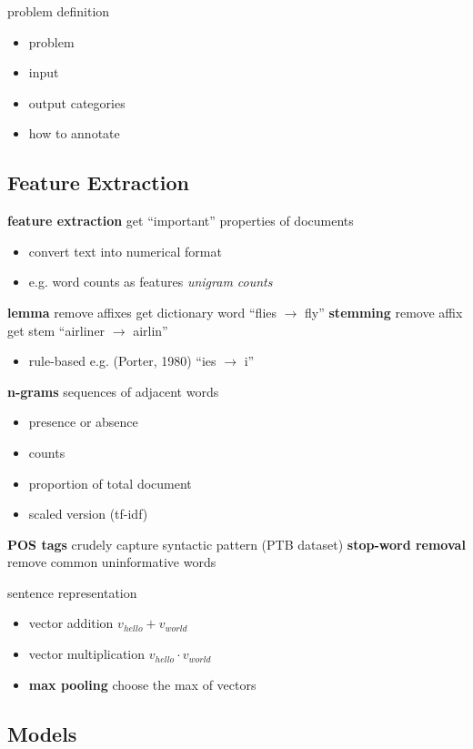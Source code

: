 \documentclass[]{article}
\theoremstyle{definition}
\begin{document}
problem definition
\begin{itemize}
    \item problem
    \item input
    \item output categories
    \item how to annotate
\end{itemize}

\subsection{Feature Extraction}%
\label{ssub:feature_extraction}


\textbf{feature extraction} get ``important'' properties of documents
\begin{itemize}
    \item convert text into numerical format
    \item e.g. word counts as features \textit{unigram counts}
\end{itemize}

\textbf{lemma} remove affixes get dictionary word ``flies $\to$ fly''
\textbf{stemming} remove affix get stem ``airliner $\to$ airlin''
\begin{itemize}
    \item rule-based e.g. (Porter, 1980) ``ies $\to$ i''
\end{itemize}
\textbf{n-grams} sequences of adjacent words
\begin{itemize}
    \item presence or absence
    \item counts
    \item proportion of total document
    \item scaled version (tf-idf)
\end{itemize}
\textbf{POS tags} crudely capture syntactic pattern (PTB dataset)
\textbf{stop-word removal} remove common uninformative words

sentence representation
\begin{itemize}
    \item vector addition $v_{hello} + v_{world}$
    \item vector multiplication $v_{hello} \cdot v_{world}$
    \item \textbf{max pooling} choose the max of vectors
\end{itemize}


\subsection{Models}%
\label{sub:models}
\end{document}
